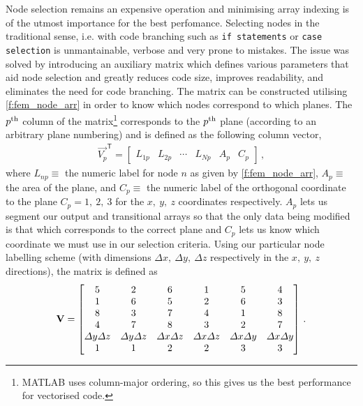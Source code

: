 		Node selection remains an expensive operation and minimising array indexing is of the utmost importance for the best perfomance. Selecting nodes in the traditional sense, i.e. with code branching such as \texttt{if statements} or \texttt{case selection} is unmantainable, verbose and very prone to mistakes. The issue was solved by introducing an auxiliary matrix which defines various parameters that aid node selection and greatly reduces code size, improves readability, and eliminates the need for code branching. The matrix can be constructed utilising \cref{f:fem_node_arr} in order to know which nodes correspond to which  planes. The $ p\textsuperscript{th} $ column of the matrix\footnote{MATLAB uses column-major ordering, so this gives us the best performance for vectorised code.} corresponds to the $ p\textsuperscript{th} $ plane (according to an arbitrary plane numbering) and is defined as the following column vector,
		\begin{align}\label{e:surf_node_util_vec}
			\vec{V_{p}}^{\mathsf{T}} =
				\begin{bmatrix}
					L_{1p} & L_{2p} & \cdots & L_{Np} & A_{p} & C_{p}
				\end{bmatrix}\,,
		\end{align}	
		where $ L_{np} \equiv $ the numeric label for node $ n $ as given by \cref{f:fem_node_arr}, $ A_{p} \equiv $ the area of the plane, and $ C_{p} \equiv$ the numeric label of the orthogonal coordinate to the plane $ C_{p} = 1, ~2, ~3 $ for the $ x, ~y, ~z $ coordinates respectively. $ A_{p} $ lets us segment our output and transitional arrays so that the only data being modified is that which corresponds to the correct plane and $ C_{p} $ lets us know which coordinate we must use in our selection criteria. Using our particular node labelling scheme (with dimensions $ \Delta x,~ \Delta y,~ \Delta z $ respectively in the $ x,~ y,~ z $ directions), the matrix is defined as
		\begin{align}\label{eq:surf_node_util}
			\mathbf{V} = 
				\begin{bmatrix}
					5 & 2 & 6 & 1 & 5 & 4\\
					1 & 6 & 5 & 2 & 6 & 3\\
					8 & 3 & 7 & 4 & 1 & 8\\
					4 & 7 & 8 & 3 & 2 & 7\\
					\Delta y \Delta z & \Delta y \Delta z & \Delta x \Delta z & \Delta x \Delta z & \Delta x \Delta y & \Delta x \Delta y\\
					1 & 1 & 2 & 2 & 3 & 3
				\end{bmatrix}\,.
		\end{align}
